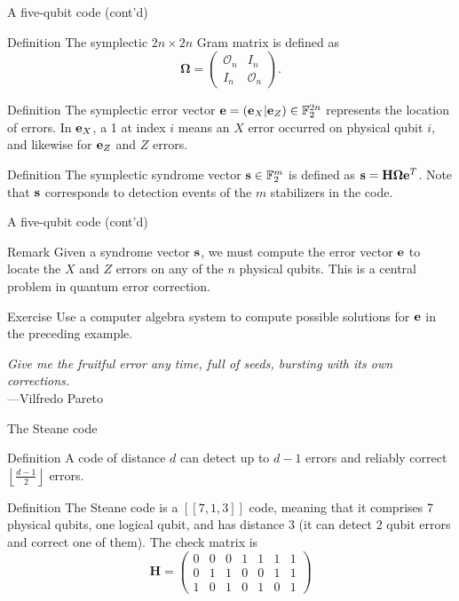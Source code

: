 \documentclass{beamer}
\newcommand{\F}{\mathbb F}
\renewcommand{\O}{\mathcal O}
\renewcommand{\vec}{\textbf}
\begin{document}
\begin{frame}{A five-qubit code (cont'd)}
    \begin{block}{Definition}
        The symplectic $2n \times 2n$ Gram matrix is defined as $$\mathbf\Omega = \begin{pmatrix}
            \O_n & I_n \\ I_n & \O_n
        \end{pmatrix}. $$
    \end{block}
    \begin{block}{Definition}
        The symplectic error vector $\vec e=(\vec e_X |\vec e_Z) \in \F_2^{2n}$ represents the location of errors. In $\vec e_X$, a 1 at index $i$ means an $X$ error occurred on physical qubit $i$, and likewise for $\vec e_Z$ and $Z$ errors.
    \end{block}
    \begin{block}{Definition}
        The symplectic syndrome vector $\vec s \in \F_2^m$ is defined as $\vec s = \mathbf H \mathbf \Omega\vec e^T$. Note that $\vec s$ corresponds to detection events of the $m$ stabilizers in the code. 
    \end{block}
\end{frame}

\begin{frame}{A five-qubit code (cont'd)}

    \begin{block}{Remark}
    	Given a syndrome vector $\vec s$, we must compute the error vector $\vec e$ to locate the $X$ and $Z$ errors on any of the $n$ physical qubits. This is a central problem in quantum error correction.
	\end{block}
	\begin{block}{Exercise}
		Use a computer algebra system to compute possible solutions for $\vec e$ in the preceding example.
	\end{block}
	\begin{flushright}
		\textit{Give me the fruitful error any time, full of seeds, bursting with its own corrections.}\\---Vilfredo Pareto
	\end{flushright}
\end{frame}

\begin{frame}{The Steane code}
	\begin{block}{Definition}
		A code of distance $d$ can detect up to $d-1$ errors and reliably correct $\left\lfloor \frac{d-1}{2}\right \rfloor$ errors.
	\end{block}
	\begin{block}{Definition}
		The Steane code is a $ [[ 7, 1, 3]] $ code, meaning that it comprises 7 physical qubits, one logical qubit, and has distance 3 (it can detect 2 qubit errors and correct one of them).
		The check matrix is $$ \mathbf H = \begin{pmatrix} 0 & 0 & 0 & 1 & 1 & 1 & 1 \\ 0 & 1 & 1 & 0 & 0 & 1 & 1 \\ 1 & 0 & 1 & 0 & 1 & 0 & 1 \end{pmatrix} $$
	\end{block}
\end{frame}
\end{document}
